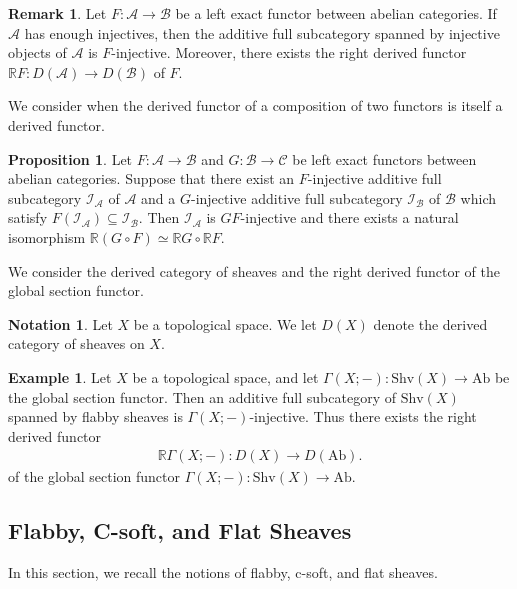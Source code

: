\documentclass[a4paper,dvipdfmx,11pt,reqno]{amsart}
\newcommand{\bbR}{\mathbb{R}}
\newcommand{\A}{\mathcal{A}}
\newcommand{\B}{\mathcal{B}}
\newcommand{\C}{\mathcal{C}}
\newcommand{\I}{\mathcal{I}}
\newcommand{\Ab}{\mathrm{Ab}}
\newcommand{\Shv}{\mathrm{Shv}}
\theoremstyle{definition}
\newtheorem{example}[theorem]{Example}
\newtheorem{notation}[theorem]{Notation}
\newtheorem{proposition}[theorem]{Proposition}
\newtheorem{remark}[theorem]{Remark}
\begin{document}
\begin{remark} \label{Ike.2.1.30}
  Let $F : \A \to \B$ be a left exact functor between abelian categories.
  If $\A$ has enough injectives, then the additive full subcategory spanned by injective objects of $\A$ is $F$-injective.
  Moreover, there exists the right derived functor $\bbR F : D(\A) \to D(\B)$ of $F$.
\end{remark}

We consider when the derived functor of a composition of two functors is itself a derived functor.

\begin{proposition} \label{Ike.2.1.31}
  Let $F : \A \to \B$ and $G : \B \to \C$ be left exact functors between abelian categories.
  Suppose that there exist an $F$-injective additive full subcategory $\I_{\A}$ of $\A$ and a $G$-injective additive full subcategory $\I_{\B}$ of $\B$ which satisfy $F(\I_{\A}) \subseteq \I_{\B}$.
  Then $\I_{\A}$ is $GF$-injective and there exists a natural isomorphism $\bbR(G \circ F) \simeq \bbR G \circ \bbR F$.
\end{proposition}

We consider the derived category of sheaves and the right derived functor of the global section functor.

\begin{notation} \label{Ike.2.2.2}
  Let $X$ be a topological space.
  We let $D(X)$ denote the derived category of sheaves on $X$.
\end{notation}

\begin{example} 
  Let $X$ be a topological space, and let $\Gamma(X;-) : \Shv(X) \to \Ab$ be the global section functor.
  Then an additive full subcategory of $\Shv(X)$ spanned by flabby sheaves is $\Gamma(X;-)$-injective.
  Thus there exists the right derived functor 
  \begin{align*}
    \bbR \Gamma(X;-) : D(X) \to D(\Ab).
  \end{align*}
  of the global section functor $\Gamma(X;-) : \Shv(X) \to \Ab$.
\end{example}


\subsection{Flabby, C-soft, and Flat Sheaves}

In this section, we recall the notions of flabby, c-soft, and flat sheaves.
\end{document}
